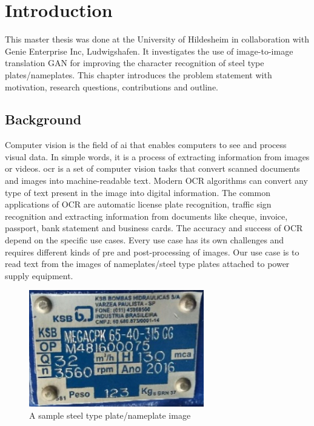 \chapter{Introduction}\label{ch:intro}
	
	This master thesis was done at the University of Hildesheim in collaboration with Genie Enterprise Inc, Ludwigshafen. It investigates the use of image-to-image translation GAN for improving the character recognition of steel type plates/nameplates. This chapter introduces the problem statement with motivation, research questions, contributions and outline.

\section{Background}
 
 		Computer vision is the field of \gls{ai} that enables computers to see and process visual data. In simple words, it is a process of extracting information from images or videos. \gls{ocr} is a set of computer vision tasks that convert scanned documents and images into machine-readable text. Modern OCR algorithms can convert any type of text present in the image into digital information. The common applications of OCR are automatic license plate recognition, traffic sign recognition and extracting information from documents like cheque, invoice, passport, bank statement and business cards. The accuracy and success of OCR depend on the specific use cases. Every use case has its own challenges and requires different kinds of pre and post-processing of images. Our use case is to read text from the images of nameplates/steel type plates attached to power supply equipment.
\newline	
\begin{figure}
\centering
\includegraphics[width=3in,scale=1]{images/one.jpg}
\caption{ A sample steel type plate/nameplate image}
\label{fig:sampleimage}
\end{figure}
